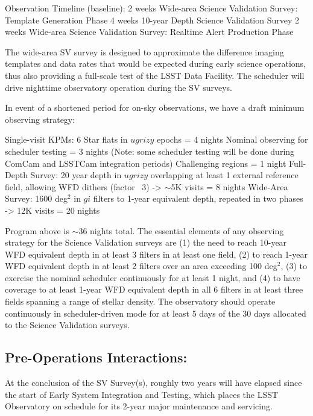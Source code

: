 Observation Timeline (baseline):
2 weeks	Wide-area Science Validation Survey: Template Generation Phase
4 weeks	10-year Depth Science Validation Survey
2 weeks	Wide-area Science Validation Survey: Realtime Alert Production Phase

The wide-area SV survey is designed to approximate the difference imaging templates and data rates that would be expected during early science operations, thus also providing a full-scale test of the LSST Data Facility. The scheduler will drive nighttime observatory operation during the SV surveys.

In event of a shortened period for on-sky observations, we have a draft minimum observing strategy:

    Single-visit KPMs:
        6 Star flats in $ugrizy$  epochs = 4 nights
    Nominal observing for scheduler testing = 3 nights (Note: some scheduler testing will be done during ComCam and LSSTCam integration periods)
    Challenging regions = 1 night
    Full-Depth Survey: 
        20 year depth in $ugrizy$ overlapping at least 1 external reference field, allowing WFD dithers (factor ~3) -> $\sim$5K visits = 8 nights
    Wide-Area Survey:
        1600 deg$^2$ in $gi$ filters to 1-year equivalent depth, repeated in two phases -> 12K visits = 20 nights

Program above is $\sim36$ nights total. The essential elements of any observing strategy for the Science Validation surveys are (1) the need to reach 10-year WFD equivalent depth in at least 3 filters in at least one field, (2) to reach 1-year WFD equivalent depth in at least 2 filters over an area exceeding 100 deg$^2$, (3) to exercise the nominal scheduler continuously for at least 1 night, and (4) to have coverage to at least 1-year WFD equivalent depth in all 6 filters in at least three fields spanning a range of stellar density. The observatory should operate continuously in scheduler-driven mode for at least 5 days of the 30 days allocated to the Science Validation surveys.

\subsection{Pre-Operations Interactions:}

At the conclusion of the SV Survey(s), roughly two years will have elapsed since the start of Early System Integration and Testing, which places the LSST Observatory on schedule for its 2-year major maintenance and servicing.

